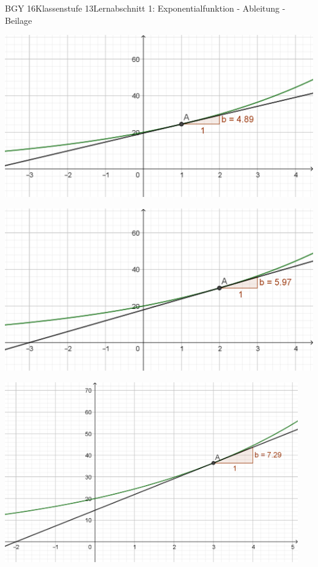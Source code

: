 \documentclass[oneside,openany,headings=optiontotoc,11pt,numbers=noenddot]{scrreprt}
\begin{document}
\begin{worksheet}{BGY 16}{Klassenstufe 13}{Lernabschnitt 1: Exponentialfunktion - Ableitung - Beilage}
\begin{framed}
			\includegraphics[width=\textwidth]{../99_Bilder/01_ExpFkt/AbleFkt/1O.png}
		\end{framed}
		\newpage
		\begin{framed}
			\noindent
			\includegraphics[width=\textwidth]{../99_Bilder/01_ExpFkt/AbleFkt/2O.png}\\
		\end{framed}
		\begin{framed}
			\includegraphics[width=0.95\textwidth]{../99_Bilder/01_ExpFkt/AbleFkt/3O.png}
		\end{framed}
	\end{worksheet}
\end{document}
